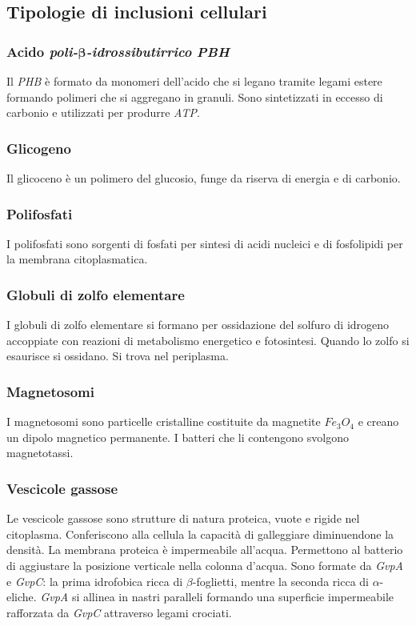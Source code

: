 	\subsection{Tipologie di inclusioni cellulari}

		\subsubsection{Acido \emph{poli-$\mathbf{\beta}$-idrossibutirrico} \emph{PBH}}
		Il \emph{PHB} \`e formato da monomeri dell'acido che si legano tramite legami estere formando polimeri che si aggregano in granuli.
		Sono sintetizzati in eccesso di carbonio e utilizzati per produrre \emph{ATP}.
		
		\subsubsection{Glicogeno}
		Il glicoceno \`e un polimero del glucosio, funge da riserva di energia e di carbonio.

		\subsubsection{Polifosfati}
		I polifosfati sono sorgenti di fosfati per sintesi di acidi nucleici e di fosfolipidi per la membrana citoplasmatica.


		\subsubsection{Globuli di zolfo elementare}
		I globuli di zolfo elementare si formano per ossidazione del solfuro di idrogeno accoppiate con reazioni di metabolismo energetico e fotosintesi.
		Quando lo zolfo si esaurisce si ossidano.
		Si trova nel periplasma.


		\subsubsection{Magnetosomi}
		I magnetosomi sono particelle cristalline costituite da magnetite \emph{$Fe_3O_4$} e creano un dipolo magnetico permanente.
			I batteri che li contengono svolgono magnetotassi.


		\subsubsection{Vescicole gassose}
		Le vescicole gassose sono strutture di natura proteica, vuote e rigide nel citoplasma.
		Conferiscono alla cellula la capacit\`a di galleggiare diminuendone la densit\`a.
		La membrana proteica \`e impermeabile all'acqua.
		Permettono al batterio di aggiustare la posizione verticale nella colonna d'acqua.
		Sono formate da \emph{GvpA} e \emph{GvpC}: la prima idrofobica ricca di $\beta$-foglietti, mentre la seconda ricca di $\alpha$-eliche.
		\emph{GvpA} si allinea in nastri paralleli formando una superficie impermeabile rafforzata da \emph{GvpC} attraverso legami crociati.

